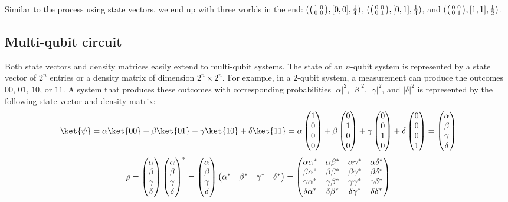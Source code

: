 Similar to the process using state vectors, we end up with three worlds in the
end: $(\big(\begin{smallmatrix}1&0\\0&0\end{smallmatrix}\big),[0,0],\frac{1}{4})$,
$(\big(\begin{smallmatrix}0&0\\0&1\end{smallmatrix}\big),[0,1],\frac{1}{4})$, and
$(\big(\begin{smallmatrix}0&0\\0&1\end{smallmatrix}\big),[1,1],\frac{1}{2})$.

\subsection{Multi-qubit circuit}
\label{ch:openqasmcore:example:multi}

\noindent
Both state vectors and density matrices easily extend to multi-qubit systems.
%
The state of an $n$-qubit system is represented by a state vector of $2^n$
entries or a density matrix of dimension $2^n \times 2^n$.
%
For example, in a $2$-qubit system, a measurement can produce the outcomes
$00$, $01$, $10$, or $11$.
%
A system that produces these outcomes with corresponding probabilities
$|\alpha|^2$, $|\beta|^2$, $|\gamma|^2$, and $|\delta|^2$ is represented by the
following state vector and density matrix:
%
\[
	\ket{\psi}
	=\alpha\ket{00}+\beta\ket{01}+\gamma\ket{10}+\delta\ket{11}
	=\alpha\mtrx{1\\0\\0\\0}+\beta\mtrx{0\\1\\0\\0}+\gamma\mtrx{0\\0\\1\\0}+\delta\mtrx{0\\0\\0\\1}
	=\mtrx{\alpha\\\beta\\\gamma\\\delta}
\]
\[
	\rho
	=\begin{pmatrix}\alpha\\\beta\\\gamma\\\delta\end{pmatrix}\begin{pmatrix}\alpha\\\beta\\\gamma\\\delta\end{pmatrix}^*
	=\begin{pmatrix}\alpha\\\beta\\\gamma\\\delta\end{pmatrix}\begin{pmatrix}\alpha^*&\beta^*&\gamma^*&\delta^*\end{pmatrix}
	=\begin{pmatrix}
		\alpha\alpha^*&\alpha\beta^*&\alpha\gamma^*&\alpha\delta^*\\
		\beta\alpha^*&\beta\beta^*&\beta\gamma^*&\beta\delta^*\\
		\gamma\alpha^*&\gamma\beta^*&\gamma\gamma^*&\gamma\delta^*\\
		\delta\alpha^*&\delta\beta^*&\delta\gamma^*&\delta\delta^*
	\end{pmatrix}
\]


